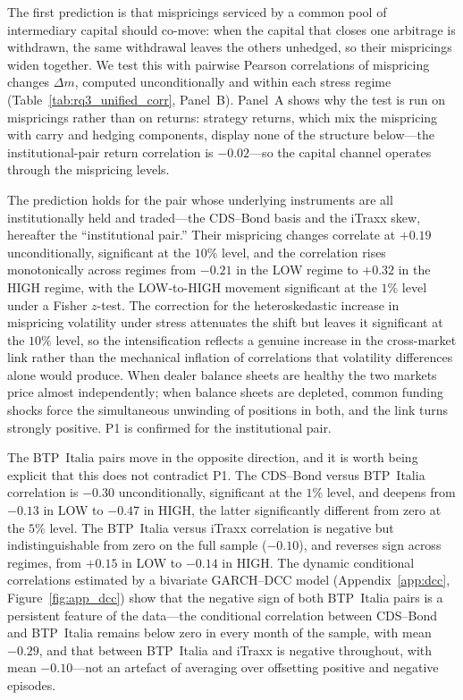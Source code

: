 The first prediction is that mispricings serviced by a common pool of
intermediary capital should co-move: when the capital that closes one
arbitrage is withdrawn, the same withdrawal leaves the others
unhedged, so their mispricings widen together. We test this with
pairwise Pearson correlations of mispricing changes $\Delta m$,
computed unconditionally and within each stress regime
(Table~\ref{tab:rq3_unified_corr}, Panel~B). Panel~A shows why the
test is run on mispricings rather than on returns: strategy returns,
which mix the mispricing with carry and hedging components, display
none of the structure below---the institutional-pair return
correlation is $-0.02$---so the capital channel operates through the
mispricing levels.

The prediction holds for the pair whose underlying instruments are all
institutionally held and traded---the CDS--Bond basis and the iTraxx
skew, hereafter the ``institutional pair.'' Their mispricing changes
correlate at $+0.19$ unconditionally, significant at the $10\%$
level, and the correlation rises monotonically across regimes from
$-0.21$ in the LOW regime to $+0.32$ in the HIGH regime, with the
LOW-to-HIGH movement significant at the $1\%$ level under a
Fisher $z$-test. The \citet{forbes2002no} correction for the
heteroskedastic increase in mispricing volatility under stress
attenuates the shift but leaves it significant at the $10\%$
level, so the intensification reflects a genuine increase in the
cross-market link rather than the mechanical inflation of correlations
that volatility differences alone would produce. When dealer balance
sheets are healthy the two markets price almost independently; when
balance sheets are depleted, common funding shocks force the
simultaneous unwinding of positions in both, and the link turns
strongly positive. P1 is confirmed for the institutional pair.

The BTP~Italia pairs move in the opposite direction, and it is worth
being explicit that this does not contradict P1. The CDS--Bond versus
BTP~Italia correlation is $-0.30$ unconditionally, significant at the
$1\%$ level, and deepens from $-0.13$ in LOW to $-0.47$ in HIGH, the latter
significantly different from zero at the $5\%$ level. The BTP~Italia versus
iTraxx correlation is negative but indistinguishable from zero on the
full sample ($-0.10$), and reverses sign across regimes, from $+0.15$
in LOW to $-0.14$ in HIGH. The dynamic conditional correlations estimated by a bivariate GARCH--DCC
model (Appendix~\ref{app:dcc}, Figure~\ref{fig:app_dcc}) show that the
negative sign of both BTP~Italia pairs is a persistent feature of the
data---the conditional correlation between CDS--Bond and BTP~Italia
remains below zero in every month of the sample, with mean $-0.29$,
and that between BTP~Italia and iTraxx is negative throughout, with
mean $-0.10$---not an artefact of averaging over offsetting positive
and negative episodes.

